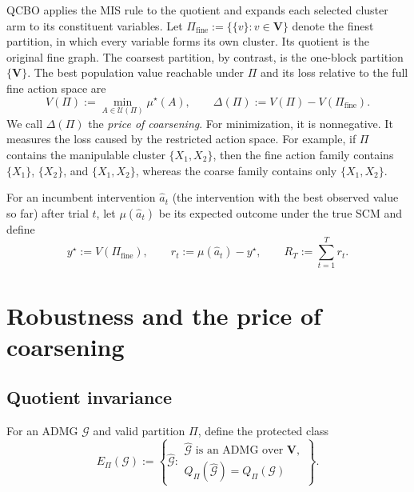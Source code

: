 \documentclass[twoside]{article}
\newcommand{\Gg}{\mathcal{G}}
\begin{document}
QCBO applies the MIS rule to the quotient and expands each selected cluster arm to its constituent variables.
Let $\Pi_{\mathrm{fine}} := \{\{v\}:v\in\mathbf V\}$ denote the finest partition, in which every variable forms its own cluster. Its quotient is the original fine graph. The coarsest partition, by contrast, is the one-block partition $\{\mathbf V\}$. The best population value reachable under $\Pi$ and its loss relative to the full fine action space are
\begin{equation}
  V(\Pi):=\min_{A\in\mathcal U(\Pi)}\mu^\star(A),
  \qquad
  \Delta(\Pi):=V(\Pi)-V(\Pi_{\mathrm{fine}}).
  \label{eq:price}
\end{equation}
We call $\Delta(\Pi)$ the \emph{price of coarsening}. For minimization, it is nonnegative. It measures the loss caused by the restricted action space. For example, if $\Pi$ contains the manipulable cluster $\{X_1,X_2\}$, then the fine action family contains $\{X_1\}$, $\{X_2\}$, and $\{X_1,X_2\}$, whereas the coarse family contains only $\{X_1,X_2\}$.

For an incumbent intervention $\hat a_t$ (the intervention with the best observed value so far) after trial $t$, let $\mu(\hat a_t)$ be its expected outcome under the true SCM and define
\begin{equation}
  y^\star:=V(\Pi_{\mathrm{fine}}),\qquad
  r_t:=\mu(\hat a_t)-y^\star,\qquad
  R_T:=\sum_{t=1}^{T}r_t.
  \label{eq:regret}
\end{equation}

\section{Robustness and the price of coarsening}
\label{sec:theory}

\subsection{Quotient invariance}
\label{sec:invariance}

For an ADMG $\Gg$ and valid partition $\Pi$, define the protected class
\begin{equation}
E_\Pi(\mathcal G)
:=
\left\{
\widehat{\mathcal G}:
\begin{array}{l}
\widehat{\mathcal G}\text{ is an ADMG over }\mathbf V,\\
Q_\Pi(\widehat{\mathcal G})=Q_\Pi(\mathcal G)
\end{array}
\right\}.
\label{eq:protected-class}
\end{equation}
\end{document}
